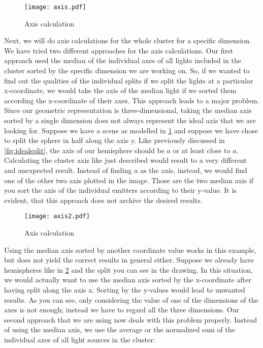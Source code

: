 \begin{figure}
	\begin{center}
		\texttt{[image: axis.pdf]}
		\caption{Axis calculation}
		\label{fig:axis}
	\end{center}
\end{figure}

Next, we will do axis calculations for the whole cluster for a specific dimension. We have tried two different approaches for the axis calculations. Our first approach used the median of the individual axes of all lights included in the cluster sorted by the specific dimension we are working on. So, if we wanted to find out the qualities of the individual splits if we split the lights at a particular x-coordinate, we would take the axis of the median light if we sorted them according the x-coordinate of their axes. This approach leads to a major problem. Since our geometric representation is three-dimensional, taking the median axis sorted by a single dimension does not always represent the ideal axis that we are looking for. Suppose we have a scene as modelled in \ref{fig:axis} and suppose we have chose to split the sphere in half along the axis y. Like previously discussed in \ref{fig:idealsplit}, the axis of our hemisphere should be $a$ or at least close to $a$. Calculating the cluster axis like just described would result to a very different and unexpected result. Instead of finding $a$ as the axis, instead, we would find one of the other two axis plotted in the image. Those are the two median axis if you sort the axis of the individual emitters according to their y-value. It is evident, that this approach does not archive the desired results. 

\begin{figure}
	\begin{center}
		\texttt{[image: axis2.pdf]}
		\caption{Axis calculation}
		\label{fig:axis2}
	\end{center}
\end{figure}


Using the median axis sorted by another coordinate value works in this example, but does not yield the correct results in general either. Suppose we already have hemispheres like in \ref{fig:axis2} and the split you can see in the drawing. In this situation, we would actually want to use the median axis sorted by the x-coordinate after having split along the axis x. Sorting by the y-values would lead to unwanted results. As you can see, only considering the value of one of the dimensions of the axes is not enough; instead we have to regard all the three dimensions. Our second approach that we are using now deals with this problem properly. Instead of using the median axis, we use the average or the normalized sum of the individual axes of all light sources in the cluster:


